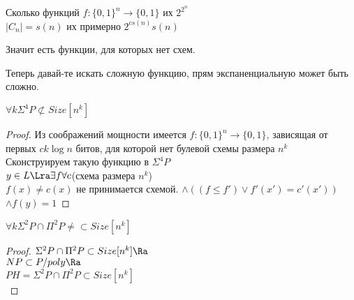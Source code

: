 Сколько функций $f\colon \{0, 1\}^n \to \{0, 1\}$ их $2^{2^n}$\\
$|C_n| = s(n)$ их примерно $2^{cs(n)}s(n)$

Значит есть функции, для которых нет схем. 

Теперь давай-те искать сложную функцию, прям экспаненциальную может быть сложно.
\begin{theorem}
$\forall k \Sigma^4P \not \subset Size[n^k]$\\
\end{theorem}
\begin{proof}
Из соображений мощности имеется $f\colon \{0, 1\}^n \to \{0, 1\}$, зависящая 
от первых $ck\log n$ битов, для которой нет булевой схемы размера $n^k$\\

Сконструируем такую функцию в $\Sigma^4P$\\
$y \in L \Lra \exists f \forall c$(схема размера $n^k$)\\
$f(x) \ne c(x)$ не принимается схемой.
$\wedge ((f \le f') \vee f'(x') = c'(x'))$
$\wedge f(y) = 1$ 
\end{proof}

\begin{conseq}
$\forall k \Sigma^2 P \cap \Pi^2P \ne \subset Size[n^k]$
\end{conseq}
\begin{proof}
$\Sigma^2P \cap \Pi^2P \subset Size[n^k] \Ra $\\
$NP \subset P/poly \Ra$\\
$PH = \Sigma^2P \cap \Pi^2P \subset Size[n^k]$\\
\end{proof}